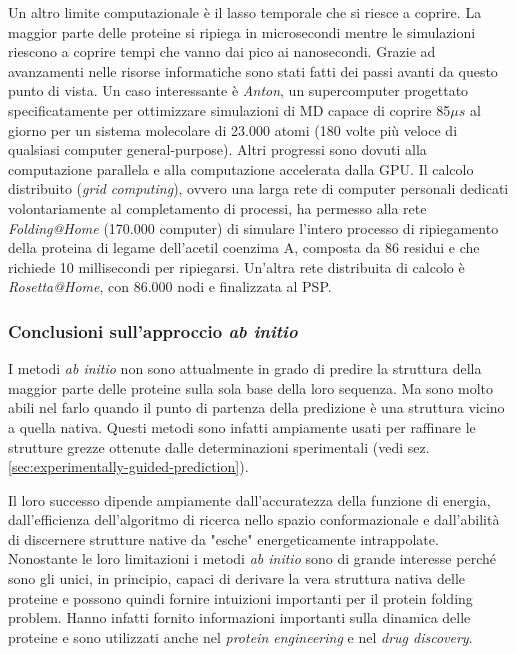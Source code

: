 {{\par Un altro limite computazionale è il lasso temporale che si riesce a coprire. La maggior parte delle proteine si ripiega in microsecondi mentre le simulazioni riescono a coprire tempi che vanno dai pico ai nanosecondi. Grazie ad avanzamenti nelle risorse informatiche sono stati fatti dei passi avanti da questo punto di vista. Un caso interessante è \textit{Anton}, un supercomputer progettato specificatamente per ottimizzare simulazioni di MD capace di coprire 85$\mu s$ al giorno per un sistema molecolare di 23.000 atomi (180 volte più veloce di qualsiasi computer general-purpose). Altri progressi sono dovuti alla computazione parallela e alla computazione accelerata dalla GPU. Il calcolo distribuito (\textit{grid computing}), ovvero una larga rete di computer personali dedicati volontariamente al completamento di processi, ha permesso alla rete \textit{Folding@Home} (170.000 computer) di simulare l'intero processo di ripiegamento della proteina di legame dell'acetil coenzima A, composta da 86 residui e che richiede 10 millisecondi per ripiegarsi. Un'altra rete distribuita di calcolo è \textit{Rosetta@Home}, con 86.000 nodi e finalizzata al PSP. \\

\subsubsection{Conclusioni sull'approccio \textit{ab initio}}
I metodi \textit{ab initio} non sono attualmente in grado di predire la struttura della maggior parte delle proteine sulla sola base della loro sequenza. Ma sono molto abili nel farlo quando il punto di partenza della predizione è una struttura vicino a quella nativa. Questi metodi sono infatti ampiamente usati per raffinare le strutture grezze ottenute dalle determinazioni sperimentali (vedi sez. \ref{sec:experimentally-guided-prediction}). 

\par Il loro successo dipende ampiamente dall'accuratezza della funzione di energia, dall'efficienza dell'algoritmo di ricerca nello spazio conformazionale e dall'abilità di discernere strutture native da "esche" energeticamente intrappolate.
Nonostante le loro limitazioni i metodi \textit{ab initio} sono di grande interesse perché sono gli unici, in principio, capaci di derivare la vera struttura nativa delle proteine e possono quindi fornire intuizioni importanti per il protein folding problem. Hanno infatti fornito informazioni importanti sulla dinamica delle proteine e sono utilizzati anche nel \textit{protein engineering} e nel \textit{drug discovery}. 

}}
